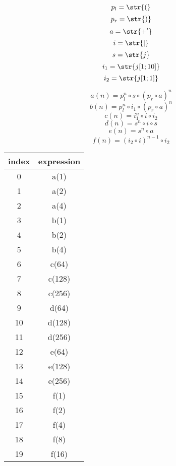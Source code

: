 $$p_l=\str{(}$$
$$p_r=\str{)}$$
$$a=\str{+'}$$
$$i=\str{|}$$
$$s=\str{j}$$
$$i_1=\str{j[1;10]}$$
$$i_2=\str{j[1;1]}$$

$$a(n)=p_l^n \circ s \circ (p_r \circ a)^n$$
$$b(n)=p_l^n \circ i_1 \circ (p_r \circ a)^n$$
$$c(n)=i_1^n \circ i \circ i_2$$
$$d(n)=s^n \circ i \circ s$$
$$e(n)=s^n \circ a$$
$$f(n)=(i_2 \circ i)^{n-1} \circ i_2$$

\begin{tabular}{|c|c|}
    \hline
    index & expression \\
    \hline
    0  & a(1) \\
    1  & a(2) \\
    2  & a(4) \\
    \hline
    3  & b(1) \\
    4  & b(2) \\
    5  & b(4) \\
    \hline
    6  & c(64) \\
    7  & c(128) \\
    8  & c(256) \\
    \hline
    9  & d(64) \\
    10 & d(128) \\
    11 & d(256) \\
    \hline
    12 & e(64) \\
    13 & e(128) \\
    14 & e(256) \\
    \hline
    15 & f(1) \\
    16 & f(2) \\
    17 & f(4) \\
    18 & f(8) \\
    19 & f(16) \\
    \hline
\end{tabular}